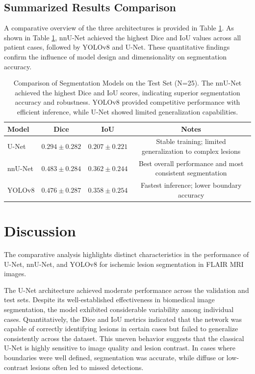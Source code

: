 \documentclass[12pt]{article}
\begin{document}
\subsection{Summarized Results Comparison} \label{subsec:comparison}

A comparative overview of the three architectures is provided in Table \ref{tab:comparison}. As shown in Table \ref{tab:comparison}, nnU-Net achieved the highest Dice and IoU values across all patient cases, followed by YOLOv8 and U-Net. These quantitative findings confirm the influence of model design and dimensionality on segmentation accuracy.

\begin{table}[h]
\centering
\begin{tabular}{lccc}
\toprule
\textbf{Model} & \textbf{Dice} & \textbf{IoU} & \textbf{Notes} \\
\midrule
U-Net & $0.294 \pm 0.282$ & $0.207 \pm 0.221$ & Stable training; limited generalization to complex lesions \\
nnU-Net & $0.483 \pm 0.284$ & $0.362 \pm 0.244$ & Best overall performance and most consistent segmentation \\
YOLOv8 & $0.476 \pm 0.287$ & $0.358 \pm 0.254$ & Fastest inference; lower boundary accuracy \\
\bottomrule
\end{tabular}
\caption{Comparison of Segmentation Models on the Test Set (N=25). The nnU-Net achieved the highest Dice and IoU scores, indicating superior segmentation accuracy and robustness. YOLOv8 provided competitive performance with efficient inference, while U-Net showed limited generalization capabilities.}
\label{tab:comparison}
\end{table}

\section{Discussion} \label{sec:discussion}


The comparative analysis highlights distinct characteristics in the performance of U-Net, nnU-Net, and YOLOv8 for ischemic lesion segmentation in FLAIR MRI images.

The U-Net architecture achieved moderate performance across the validation and test sets. Despite its well-established effectiveness in biomedical image segmentation, the model exhibited considerable variability among individual cases. Quantitatively, the Dice and IoU metrics indicated that the network was capable of correctly identifying lesions in certain cases but failed to generalize consistently across the dataset. This uneven behavior suggests that the classical U-Net is highly sensitive to image quality and lesion contrast. In cases where boundaries were well defined, segmentation was accurate, while diffuse or low-contrast lesions often led to missed detections.
\end{document}
